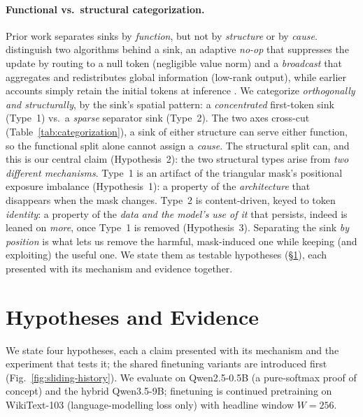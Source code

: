\documentclass[letterpaper]{article} %
\begin{document}
\paragraph{Functional vs.\ structural categorization.} Prior work separates sinks by \emph{function}, but not by \emph{structure} or by \emph{cause}. \citet{fesser2026unifying} distinguish two algorithms behind a sink, an adaptive \emph{no-op} that suppresses the update by routing to a null token (negligible value norm) and a \emph{broadcast} that aggregates and redistributes global information (low-rank output), while earlier accounts simply retain the initial tokens at inference \citep{xiao2024streamingllm,han2024lminfinite}. We categorize \emph{orthogonally and structurally}, by the sink's spatial pattern: a \emph{concentrated} first-token sink (Type~1) vs.\ a \emph{sparse} separator sink (Type~2). The two axes cross-cut (Table~\ref{tab:categorization}), a sink of either structure can serve either function, so the functional split alone cannot assign a \emph{cause}. The structural split can, and this is our central claim (Hypothesis~2): the two structural types arise from \emph{two different mechanisms}. Type~1 is an artifact of the triangular mask's positional exposure imbalance (Hypothesis~1): a property of the \emph{architecture} that disappears when the mask changes. Type~2 is content-driven, keyed to token \emph{identity}: a property of the \emph{data and the model's use of it} that persists, indeed is leaned on \emph{more}, once Type~1 is removed (Hypothesis~3). Separating the sink \emph{by position} is what lets us remove the harmful, mask-induced one while keeping (and exploiting) the useful one. We state them as testable hypotheses (\S\ref{sec:hyp}), each presented with its mechanism and evidence together.


\section{Hypotheses and Evidence}
\label{sec:hyp}
\label{sec:exp}
\label{sec:method}

We state four hypotheses, each a claim presented with its mechanism and the experiment that tests it; the shared finetuning variants are introduced first (Fig.~\ref{fig:sliding-history}). We evaluate on Qwen2.5-0.5B (a pure-softmax proof of concept) and the hybrid Qwen3.5-9B; finetuning is continued pretraining on WikiText-103 \citep{merity2017wikitext} (language-modelling loss only) with headline window $W{=}256$.
\end{document}
